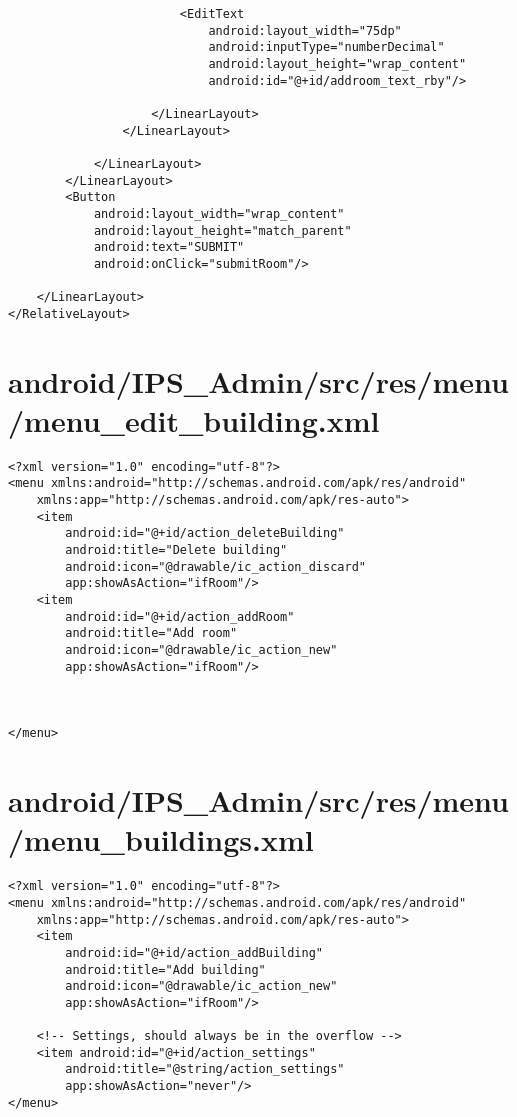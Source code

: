 \begin{lstlisting}
                        <EditText
                            android:layout_width="75dp"
                            android:inputType="numberDecimal"
                            android:layout_height="wrap_content"
                            android:id="@+id/addroom_text_rby"/>

                    </LinearLayout>
                </LinearLayout>

            </LinearLayout>
        </LinearLayout>
        <Button
            android:layout_width="wrap_content"
            android:layout_height="match_parent"
            android:text="SUBMIT"
            android:onClick="submitRoom"/>

    </LinearLayout>
</RelativeLayout>
\end{lstlisting}
\newpage
\section{android/IPS\_Admin/src/res/menu/menu\_edit\_building.xml}
\begin{lstlisting}<?xml version="1.0" encoding="utf-8"?>
<menu xmlns:android="http://schemas.android.com/apk/res/android"
    xmlns:app="http://schemas.android.com/apk/res-auto">
    <item
        android:id="@+id/action_deleteBuilding"
        android:title="Delete building"
        android:icon="@drawable/ic_action_discard"
        app:showAsAction="ifRoom"/>
    <item
        android:id="@+id/action_addRoom"
        android:title="Add room"
        android:icon="@drawable/ic_action_new"
        app:showAsAction="ifRoom"/>



</menu>
\end{lstlisting}
\newpage
\section{android/IPS\_Admin/src/res/menu/menu\_buildings.xml}
\begin{lstlisting}<?xml version="1.0" encoding="utf-8"?>
<menu xmlns:android="http://schemas.android.com/apk/res/android"
    xmlns:app="http://schemas.android.com/apk/res-auto">
    <item
        android:id="@+id/action_addBuilding"
        android:title="Add building"
        android:icon="@drawable/ic_action_new"
        app:showAsAction="ifRoom"/>

    <!-- Settings, should always be in the overflow -->
    <item android:id="@+id/action_settings"
        android:title="@string/action_settings"
        app:showAsAction="never"/>
</menu>
\end{lstlisting}
\newpage
